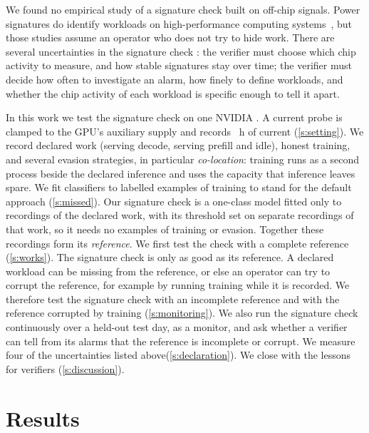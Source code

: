 \documentclass{article}
\begin{document}
We found no empirical study of a signature check built on off-chip signals. Power signatures do
identify workloads on high-performance computing systems~\citep{copos2020,kohler2021,karimi2024},
but those studies assume an operator who does not try to hide work. There are several uncertainties in the signature check \citep{scher2025}: the verifier must choose which chip activity to measure, and how stable signatures stay over time; the verifier must decide how often to investigate an alarm, how finely to define workloads, and whether the chip activity of each workload is specific enough to tell it apart.

In this work we test the signature check on one NVIDIA \GPU{}. A current probe is clamped to the GPU's auxiliary supply and records \CorpusHours{}~h of current
(\cref{s:setting}). We record declared work
(serving decode, serving prefill and idle), honest training, and several evasion
strategies, in particular \emph{co-location}: training runs as a second process beside
the declared inference and uses the capacity that inference leaves spare. We fit
classifiers to labelled examples of training to stand for the default approach
(\cref{s:missed}). Our signature
check is a one-class model fitted only to recordings of the declared work, with its threshold set
on separate recordings of that work, so it needs no examples of training or evasion. Together these recordings form its
\emph{reference}. We first test the check with a complete reference (\cref{s:works}).
The signature check is only as good
as its reference. A declared workload can be missing from the reference, or else an operator can try to corrupt the reference, for example by running training while it is recorded. We therefore
test the signature check with an incomplete reference and with the reference corrupted by training (\cref{s:monitoring}). We also run the signature check continuously over a held-out test day, as a monitor, and ask whether a verifier can tell from its alarms that the reference is incomplete or corrupt. We measure four of the uncertainties listed above(\cref{s:declaration}). 
We close with the lessons for verifiers (\cref{s:discussion}).


\section{Results}\label{s:results}






\end{document}
